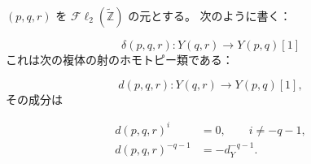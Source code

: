 $(p,q,r)$ を $\mathcal{F}\ell_2(\widetilde{\mathbb Z})$ の元とする。
次のように書く：

\begin{equation}
\delta(p,q,r)\colon Y(q,r)\longrightarrow Y(p,q)[1]
\tag{4.1.2.6}
\end{equation}
これは次の複体の射のホモトピー類である：

\begin{equation}
d(p,q,r)\colon Y(q,r)\longrightarrow Y(p,q)[1],
\tag{4.1.2.7}
\end{equation}
その成分は

\begin{equation}
\begin{aligned}
d(p,q,r)^i&=0,\qquad i\neq-q-1,\\
d(p,q,r)^{-q-1}&=-d_Y^{-q-1}.
\end{aligned}
\tag{4.1.2.8}
\end{equation}
\endgroup
